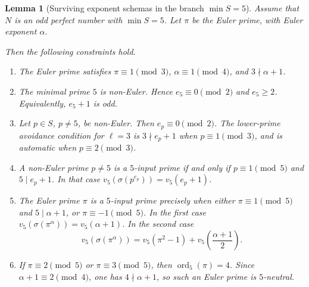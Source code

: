 \documentclass[11pt]{article}
\newtheorem{lemma}[theorem]{Lemma}
\theoremstyle{definition}
\theoremstyle{remark}
\DeclareMathOperator{\ord}{ord}
\begin{document}
\begin{lemma}[Surviving exponent schemas in the branch $\min S=5$]
\label{lem:q5-surviving-exponent-schemas}
Assume that \(N\) is an odd perfect number with \(\min S=5\).  Let \(\pi\) be
the Euler prime, with Euler exponent \(\alpha\).

Then the following constraints hold.

\begin{enumerate}[label=(\roman*),leftmargin=2.2em]

\item The Euler prime satisfies \(\pi\equiv1\pmod3\),
      \(\alpha\equiv1\pmod4\), and \(3\nmid\alpha+1\).

\item The minimal prime \(5\) is non-Euler.  Hence
      \(e_5\equiv0\pmod2\) and \(e_5\ge2\).
      Equivalently, \(e_5+1\) is odd.

\item Let \(p\in S\), \(p\ne5\), be non-Euler.  Then
      \(e_p\equiv0\pmod2\).
      The lower-prime avoidance condition for \(\ell=3\) is
      \(3\nmid e_p+1\) when \(p\equiv1\pmod3\), and is automatic when
      \(p\equiv2\pmod3\).

\item A non-Euler prime \(p\ne5\) is a \(5\)-input prime if and only if
      \(p\equiv1\pmod5\) and \(5\mid e_p+1\).
      In that case \(v_5(\sigma(p^{e_p}))=v_5(e_p+1)\).

\item The Euler prime \(\pi\) is a \(5\)-input prime precisely when either
      \(\pi\equiv1\pmod5\) and \(5\mid\alpha+1\), or
      \(\pi\equiv-1\pmod5\).
      In the first case \(v_5(\sigma(\pi^\alpha))=v_5(\alpha+1)\).
      In the second case
      \[
        v_5(\sigma(\pi^\alpha))
        =
        v_5(\pi^2-1)+v_5\!\left(\frac{\alpha+1}{2}\right).
      \]

\item If \(\pi\equiv2\pmod5\) or \(\pi\equiv3\pmod5\), then
      \(\ord_5(\pi)=4\).  Since \(\alpha+1\equiv2\pmod4\), one has
      \(4\nmid\alpha+1\), so such an Euler prime is \(5\)-neutral.
\end{enumerate}
\end{lemma}
\end{document}
